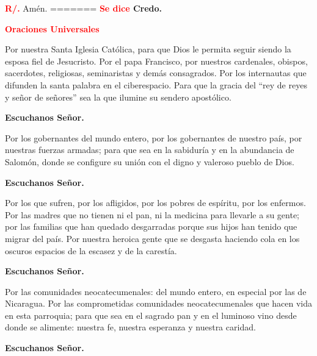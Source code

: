 \documentclass[12pt, letterpaper, spanish]{report}
\begin{document}
\Large \hspace{-0.9cm} {\bfseries \textcolor{red}{R/.}} \hspace{0.5cm} Am\'en.\newline
=======
\Large {\bfseries \textcolor{red}{Se dice} Credo.} \newline

\Large {\bfseries \textcolor{red}{Oraciones Universales}} \newline

\Large Por nuestra Santa Iglesia Cat\'olica, para que Dios le permita seguir siendo la esposa
fiel de Jesucristo. Por el papa Francisco, por nuestros cardenales, obispos, sacerdotes,
religiosas, seminaristas y dem\'as consagrados. Por los internautas que difunden la santa palabra
en el ciberespacio. Para que la gracia del  ``rey de reyes y se\~nor de se\~nores'' sea la que
ilumine su sendero apost\'olico. \newline

{\bfseries Escuchanos Se\~nor.} \newline

\Large Por los gobernantes del mundo entero, por los gobernantes de nuestro pa\'is, por nuestras
fuerzas armadas; para que sea en la sabidur\'ia y en la abundancia de Salom\'on, donde se
configure su uni\'on con el digno y valeroso pueblo de Dios. \newline

{\bfseries Escuchanos Se\~nor.} \newline

\Large Por los que sufren, por los afligidos, por los pobres de esp\'iritu, por los enfermos. 
Por las madres que no tienen ni el pan, ni la medicina para llevarle a su gente; 
por las familias que han quedado desgarradas porque sus hijos han tenido que migrar del pa\'is.
Por nuestra heroica gente que se desgasta haciendo cola en los oscuros espacios de la escasez 
y de la carest\'ia. \newline

{\bfseries Escuchanos Se\~nor.} \newline

\Large Por las comunidades neocatecumenales: del mundo entero, en especial por las de Nicaragua. 
Por las comprometidas comunidades neocatecumenales que hacen vida en esta parroquia; 
para que sea en el sagrado pan y en el luminoso vino desde donde se alimente: 
nuestra fe, nuestra esperanza y nuestra caridad. \newline

{\bfseries Escuchanos Se\~nor.} \newline
\end{document}
